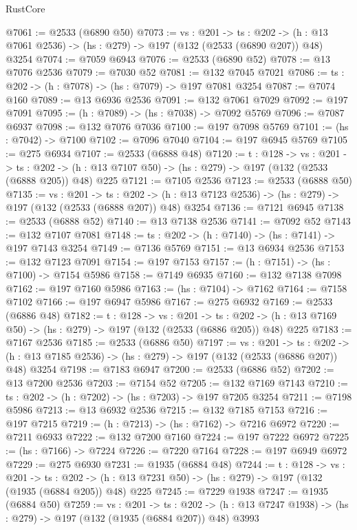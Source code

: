 \begin{lexlean}{RustCore}
\begin{coremodule}
@7061 := @2533 (@6890 @50)
@7073 := {vs : @201} ->
  {ts : @202} -> (h : @13 @7061 @2536) -> (hs : @279) -> @197 (@132 (@2533 (@6890 @207)) @48) @3254
@7074 := @7059 @6943
@7076 := @2533 (@6890 @52)
@7078 := @13 @7076 @2536
@7079 := @7030 @52
@7081 := @132 @7045 @7021
@7086 := {ts : @202} -> (h : @7078) -> (hs : @7079) -> @197 @7081 @3254
@7087 := @7074 @160
@7089 := @13 @6936 @2536
@7091 := @132 @7061 @7029
@7092 := @197 @7091
@7095 := (h : @7089) -> (hs : @7038) -> @7092 @5769
@7096 := @7087 @6937
@7098 := @132 @7076 @7036
@7100 := @197 @7098 @5769
@7101 := (hs : @7042) -> @7100
@7102 := @7096 @7040
@7104 := @197 @6945 @5769
@7105 := @275 @6934
@7107 := @2533 (@6888 @48)
@7120 := {t : @128} ->
  {vs : @201} ->
  {ts : @202} -> (h : @13 @7107 @50) -> (hs : @279) -> @197 (@132 (@2533 (@6888 @205)) @48) @225
@7121 := @7105 @2536
@7123 := @2533 (@6888 @50)
@7135 := {vs : @201} ->
  {ts : @202} -> (h : @13 @7123 @2536) -> (hs : @279) -> @197 (@132 (@2533 (@6888 @207)) @48) @3254
@7136 := @7121 @6945
@7138 := @2533 (@6888 @52)
@7140 := @13 @7138 @2536
@7141 := @7092 @52
@7143 := @132 @7107 @7081
@7148 := {ts : @202} -> (h : @7140) -> (hs : @7141) -> @197 @7143 @3254
@7149 := @7136 @5769
@7151 := @13 @6934 @2536
@7153 := @132 @7123 @7091
@7154 := @197 @7153
@7157 := (h : @7151) -> (hs : @7100) -> @7154 @5986
@7158 := @7149 @6935
@7160 := @132 @7138 @7098
@7162 := @197 @7160 @5986
@7163 := (hs : @7104) -> @7162
@7164 := @7158 @7102
@7166 := @197 @6947 @5986
@7167 := @275 @6932
@7169 := @2533 (@6886 @48)
@7182 := {t : @128} ->
  {vs : @201} ->
  {ts : @202} -> (h : @13 @7169 @50) -> (hs : @279) -> @197 (@132 (@2533 (@6886 @205)) @48) @225
@7183 := @7167 @2536
@7185 := @2533 (@6886 @50)
@7197 := {vs : @201} ->
  {ts : @202} -> (h : @13 @7185 @2536) -> (hs : @279) -> @197 (@132 (@2533 (@6886 @207)) @48) @3254
@7198 := @7183 @6947
@7200 := @2533 (@6886 @52)
@7202 := @13 @7200 @2536
@7203 := @7154 @52
@7205 := @132 @7169 @7143
@7210 := {ts : @202} -> (h : @7202) -> (hs : @7203) -> @197 @7205 @3254
@7211 := @7198 @5986
@7213 := @13 @6932 @2536
@7215 := @132 @7185 @7153
@7216 := @197 @7215
@7219 := (h : @7213) -> (hs : @7162) -> @7216 @6972
@7220 := @7211 @6933
@7222 := @132 @7200 @7160
@7224 := @197 @7222 @6972
@7225 := (hs : @7166) -> @7224
@7226 := @7220 @7164
@7228 := @197 @6949 @6972
@7229 := @275 @6930
@7231 := @1935 (@6884 @48)
@7244 := {t : @128} ->
  {vs : @201} ->
  {ts : @202} -> (h : @13 @7231 @50) -> (hs : @279) -> @197 (@132 (@1935 (@6884 @205)) @48) @225
@7245 := @7229 @1938
@7247 := @1935 (@6884 @50)
@7259 := {vs : @201} ->
  {ts : @202} -> (h : @13 @7247 @1938) -> (hs : @279) -> @197 (@132 (@1935 (@6884 @207)) @48) @3993

\end{coremodule}
\end{lexlean}
